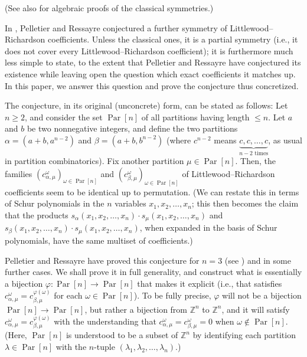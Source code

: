 \documentclass[numbers=enddot,12pt,final,onecolumn,notitlepage]{scrartcl}%
\theoremstyle{definition}
\newenvironment{noncompile}{}{}
\begin{document}
\begin{noncompile}
(See also \cite[Exercises 2.7.11(c), 2.9.15(c) and 2.9.16(c)]{GriRei} for
algebraic proofs of the classical symmetries.)
\end{noncompile}

In \cite{PelRes20}, Pelletier and Ressayre conjectured a further symmetry of
Littlewood--Richardson coefficients. Unless the classical ones, it is a
partial symmetry (i.e., it does not cover every Littlewood--Richardson
coefficient); it is furthermore much less simple to state, to the extent that
Pelletier and Ressayre have conjectured its existence while leaving open the
question which exact coefficients it matches up. In this paper, we answer this
question and prove the conjecture thus concretized.

The conjecture, in its original (unconcrete) form, can be stated as follows:
Let $n\geq2$, and consider the set $\operatorname*{Par}\left[  n\right]  $ of
all partitions having length $\leq n$. Let $a$ and $b$ be two nonnegative
integers, and define the two partitions $\alpha=\left(  a+b,a^{n-2}\right)  $
and $\beta=\left(  a+b,b^{n-2}\right)  $ (where $c^{n-2}$ means
$\underbrace{c,c,\ldots,c}_{n-2\text{ times}}$, as usual in partition
combinatorics). Fix another partition $\mu\in\operatorname*{Par}\left[
n\right]  $. Then, the families $\left(  c_{\alpha,\mu}^{\omega}\right)
_{\omega\in\operatorname*{Par}\left[  n\right]  }$ and $\left(  c_{\beta,\mu
}^{\omega}\right)  _{\omega\in\operatorname*{Par}\left[  n\right]  }$ of
Littlewood--Richardson coefficients seem to be identical up to permutation.
(We can restate this in terms of Schur polynomials in the $n$ variables
$x_{1},x_{2},\ldots,x_{n}$; this then becomes the claim that the products
$s_{\alpha}\left(  x_{1},x_{2},\ldots,x_{n}\right)  \cdot s_{\mu}\left(
x_{1},x_{2},\ldots,x_{n}\right)  $ and $s_{\beta}\left(  x_{1},x_{2}%
,\ldots,x_{n}\right)  \cdot s_{\mu}\left(  x_{1},x_{2},\ldots,x_{n}\right)  $,
when expanded in the basis of Schur polynomials, have the same multiset of coefficients.)

Pelletier and Ressayre have proved this conjecture for $n=3$ (see
\cite[Corollary 2]{PelRes20}) and in some further cases. We shall prove it in
full generality, and construct what is essentially a bijection $\varphi
:\operatorname*{Par}\left[  n\right]  \rightarrow\operatorname*{Par}\left[
n\right]  $ that makes it explicit (i.e., that satisfies $c_{\alpha,\mu
}^{\omega}=c_{\beta,\mu}^{\varphi\left(  \omega\right)  }$ for each $\omega
\in\operatorname*{Par}\left[  n\right]  $). To be fully precise, $\varphi$
will not be a bijection $\operatorname*{Par}\left[  n\right]  \rightarrow
\operatorname*{Par}\left[  n\right]  $, but rather a bijection from
$\mathbb{Z}^{n}$ to $\mathbb{Z}^{n}$, and it will satisfy $c_{\alpha,\mu
}^{\omega}=c_{\beta,\mu}^{\varphi\left(  \omega\right)  }$ with the
understanding that $c_{\alpha,\mu}^{\omega}=c_{\beta,\mu}^{\omega}=0$ when
$\omega\notin\operatorname*{Par}\left[  n\right]  $. (Here,
$\operatorname*{Par}\left[  n\right]  $ is understood to be a subset of
$\mathbb{Z}^{n}$ by identifying each partition $\lambda\in\operatorname*{Par}%
\left[  n\right]  $ with the $n$-tuple $\left(  \lambda_{1},\lambda_{2}%
,\ldots,\lambda_{n}\right)  $.)
\end{document}

